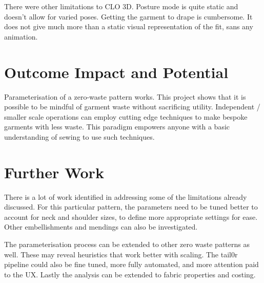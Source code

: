 There were other limitations to CLO 3D. Posture mode is quite static and doesn’t allow for varied poses. Getting the garment to drape is cumbersome. It does not give much more than a static visual representation of the fit, sans any animation.


\section{Outcome Impact and Potential}
Parameterisation of a zero-waste pattern works. This project shows that it is possible to be mindful of garment waste without sacrificing utility. Independent / smaller scale operations can employ cutting edge techniques to make bespoke garments with less waste. This paradigm empowers anyone with a basic understanding of sewing to use such techniques.

\section{Further Work}
There is a lot of work identified in addressing some of the limitations already discussed.
For this particular pattern, the parameters need to be tuned better to account for neck and shoulder sizes, to define more appropriate settings for ease. Other embellishments and mendings can also be investigated.

The parameterisation process can be extended to other zero waste patterns as well. These may reveal heuristics that work better with scaling.
The tail0r pipeline could also be fine tuned, more fully automated, and more attention paid to the UX. 
Lastly the analysis can be extended to fabric properties and costing.
